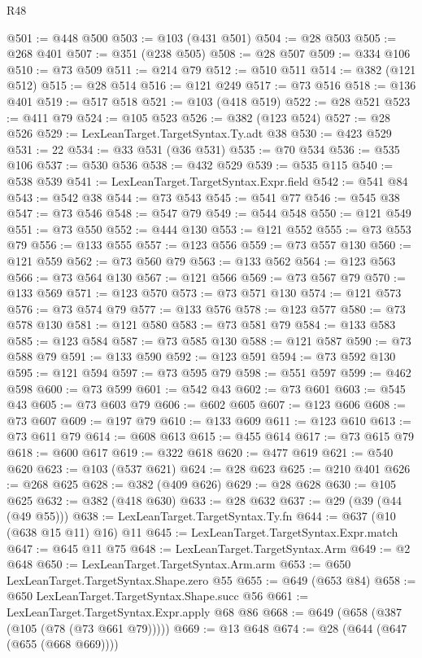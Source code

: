 \begin{lexlean}{R48}
\begin{coremodule}
@501 := @448 @500
@503 := @103 (@431 @501)
@504 := @28 @503
@505 := @268 @401
@507 := @351 (@238 @505)
@508 := @28 @507
@509 := @334 @106
@510 := @73 @509
@511 := @214 @79
@512 := @510 @511
@514 := @382 (@121 @512)
@515 := @28 @514
@516 := @121 @249
@517 := @73 @516
@518 := @136 @401
@519 := @517 @518
@521 := @103 (@418 @519)
@522 := @28 @521
@523 := @411 @79
@524 := @105 @523
@526 := @382 (@123 @524)
@527 := @28 @526
@529 := LexLeanTarget.TargetSyntax.Ty.adt @38
@530 := @423 @529
@531 := 22
@534 := @33 @531 (@36 @531)
@535 := @70 @534
@536 := @535 @106
@537 := @530 @536
@538 := @432 @529
@539 := @535 @115
@540 := @538 @539
@541 := LexLeanTarget.TargetSyntax.Expr.field
@542 := @541 @84
@543 := @542 @38
@544 := @73 @543
@545 := @541 @77
@546 := @545 @38
@547 := @73 @546
@548 := @547 @79
@549 := @544 @548
@550 := @121 @549
@551 := @73 @550
@552 := @444 @130
@553 := @121 @552
@555 := @73 @553 @79
@556 := @133 @555
@557 := @123 @556
@559 := @73 @557 @130
@560 := @121 @559
@562 := @73 @560 @79
@563 := @133 @562
@564 := @123 @563
@566 := @73 @564 @130
@567 := @121 @566
@569 := @73 @567 @79
@570 := @133 @569
@571 := @123 @570
@573 := @73 @571 @130
@574 := @121 @573
@576 := @73 @574 @79
@577 := @133 @576
@578 := @123 @577
@580 := @73 @578 @130
@581 := @121 @580
@583 := @73 @581 @79
@584 := @133 @583
@585 := @123 @584
@587 := @73 @585 @130
@588 := @121 @587
@590 := @73 @588 @79
@591 := @133 @590
@592 := @123 @591
@594 := @73 @592 @130
@595 := @121 @594
@597 := @73 @595 @79
@598 := @551 @597
@599 := @462 @598
@600 := @73 @599
@601 := @542 @43
@602 := @73 @601
@603 := @545 @43
@605 := @73 @603 @79
@606 := @602 @605
@607 := @123 @606
@608 := @73 @607
@609 := @197 @79
@610 := @133 @609
@611 := @123 @610
@613 := @73 @611 @79
@614 := @608 @613
@615 := @455 @614
@617 := @73 @615 @79
@618 := @600 @617
@619 := @322 @618
@620 := @477 @619
@621 := @540 @620
@623 := @103 (@537 @621)
@624 := @28 @623
@625 := @210 @401
@626 := @268 @625
@628 := @382 (@409 @626)
@629 := @28 @628
@630 := @105 @625
@632 := @382 (@418 @630)
@633 := @28 @632
@637 := @29 (@39 (@44 (@49 @55)))
@638 := LexLeanTarget.TargetSyntax.Ty.fn
@644 := @637 (@10 (@638 @15 @11) @16) @11
@645 := LexLeanTarget.TargetSyntax.Expr.match
@647 := @645 @11 @75
@648 := LexLeanTarget.TargetSyntax.Arm
@649 := @2 @648
@650 := LexLeanTarget.TargetSyntax.Arm.arm
@653 := @650 LexLeanTarget.TargetSyntax.Shape.zero @55
@655 := @649 (@653 @84)
@658 := @650 LexLeanTarget.TargetSyntax.Shape.succ @56
@661 := LexLeanTarget.TargetSyntax.Expr.apply @68 @86
@668 := @649 (@658 (@387 (@105 (@78 (@73 @661 @79)))))
@669 := @13 @648
@674 := @28 (@644 (@647 (@655 (@668 @669))))

\end{coremodule}
\end{lexlean}

